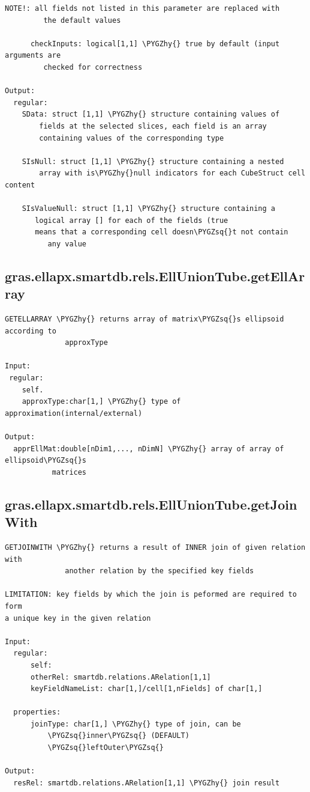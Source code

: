 \documentclass[letterpaper,10pt,english]{sphinxmanual}
\def\PYGZhy{\char`\-}
\def\PYGZsq{\char`\'}
\begin{document}
\begin{Verbatim}[commandchars=\\\{\}]
         NOTE!: all fields not listed in this parameter are replaced with
         the default values

      checkInputs: logical[1,1] \PYGZhy{} true by default (input arguments are
         checked for correctness

Output:
  regular:
    SData: struct [1,1] \PYGZhy{} structure containing values of
        fields at the selected slices, each field is an array
        containing values of the corresponding type

    SIsNull: struct [1,1] \PYGZhy{} structure containing a nested
        array with is\PYGZhy{}null indicators for each CubeStruct cell content

    SIsValueNull: struct [1,1] \PYGZhy{} structure containing a
       logical array [] for each of the fields (true
       means that a corresponding cell doesn\PYGZsq{}t not contain
          any value
\end{Verbatim}


\subsection{gras.ellapx.smartdb.rels.EllUnionTube.getEllArray}
\label{chap_functions:gras-ellapx-smartdb-rels-elluniontube-getellarray}
\begin{Verbatim}[commandchars=\\\{\}]
GETELLARRAY \PYGZhy{} returns array of matrix\PYGZsq{}s ellipsoid according to
              approxType

Input:
 regular:
    self.
    approxType:char[1,] \PYGZhy{} type of approximation(internal/external)

Output:
  apprEllMat:double[nDim1,..., nDimN] \PYGZhy{} array of array of ellipsoid\PYGZsq{}s
           matrices
\end{Verbatim}


\subsection{gras.ellapx.smartdb.rels.EllUnionTube.getJoinWith}
\label{chap_functions:gras-ellapx-smartdb-rels-elluniontube-getjoinwith}
\begin{Verbatim}[commandchars=\\\{\}]
GETJOINWITH \PYGZhy{} returns a result of INNER join of given relation with
              another relation by the specified key fields

LIMITATION: key fields by which the join is peformed are required to form
a unique key in the given relation

Input:
  regular:
      self:
      otherRel: smartdb.relations.ARelation[1,1]
      keyFieldNameList: char[1,]/cell[1,nFields] of char[1,]

  properties:
      joinType: char[1,] \PYGZhy{} type of join, can be
          \PYGZsq{}inner\PYGZsq{} (DEFAULT)
          \PYGZsq{}leftOuter\PYGZsq{}

Output:
  resRel: smartdb.relations.ARelation[1,1] \PYGZhy{} join result
\end{Verbatim}
\end{document}
